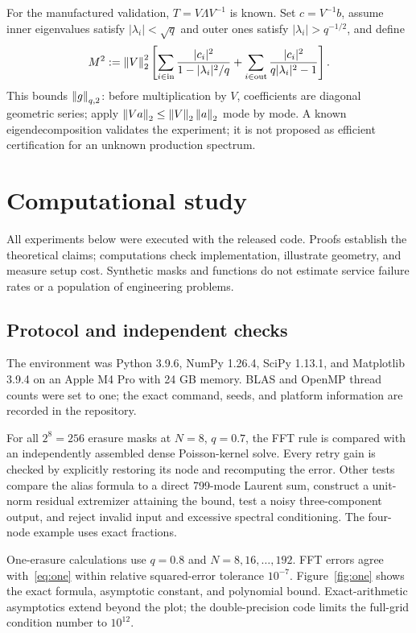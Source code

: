 \documentclass[11pt]{article}
\begin{document}
For the manufactured validation, $T=V\Lambda V^{-1}$ is known. Set $c=V^{-1}b$, assume inner eigenvalues satisfy $|\lambda_i|<\sqrt q$ and outer ones satisfy $|\lambda_i|>q^{-1/2}$, and define
\begin{equation}
M^2:=\left\lVert V\right\rVert_2^2\left[
\sum_{i\in\mathrm{in}}\frac{|c_i|^2}{1-|\lambda_i|^2/q}
+\sum_{i\in\mathrm{out}}\frac{|c_i|^2}{q|\lambda_i|^2-1}\right].
\label{eq:Mmatrix}
\end{equation}
This bounds $\left\lVert g\right\rVert_{q,2}$: before multiplication by $V$, coefficients are diagonal geometric series; apply $\left\lVert Va\right\rVert_2\le\left\lVert V\right\rVert_2\left\lVert a\right\rVert_2$ mode by mode. A known eigendecomposition validates the experiment; it is not proposed as efficient certification for an unknown production spectrum.

\section{Computational study}
All experiments below were executed with the released code. Proofs establish the theoretical claims; computations check implementation, illustrate geometry, and measure setup cost. Synthetic masks and functions do not estimate service failure rates or a population of engineering problems.

\subsection{Protocol and independent checks}
The environment was Python 3.9.6, NumPy 1.26.4, SciPy 1.13.1, and Matplotlib 3.9.4 on an Apple M4 Pro with 24 GB memory. BLAS and OpenMP thread counts were set to one; the exact command, seeds, and platform information are recorded in the repository.

For all $2^8=256$ erasure masks at $N=8$, $q=0.7$, the FFT rule is compared with an independently assembled dense Poisson-kernel solve. Every retry gain is checked by explicitly restoring its node and recomputing the error. Other tests compare the alias formula to a direct 799-mode Laurent sum, construct a unit-norm residual extremizer attaining the bound, test a noisy three-component output, and reject invalid input and excessive spectral conditioning. The four-node example uses exact fractions.

One-erasure calculations use $q=0.8$ and $N=8,16,\ldots,192$. FFT errors agree with~\eqref{eq:one} within relative squared-error tolerance $10^{-7}$. Figure~\ref{fig:one} shows the exact formula, asymptotic constant, and polynomial bound. Exact-arithmetic asymptotics extend beyond the plot; the double-precision code limits the full-grid condition number to $10^{12}$.
\end{document}
